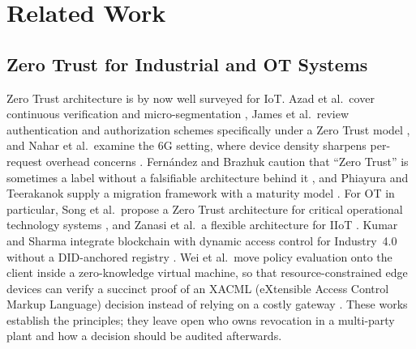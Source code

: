 \section{Related Work}\label{sec:related}

\subsection{Zero Trust for Industrial and OT Systems}
Zero Trust architecture is by now well surveyed for IoT. Azad et al.\ cover continuous verification and micro-segmentation \cite{azad2024verify}, James et al.\ review authentication and authorization schemes specifically under a Zero Trust model \cite{james2024authz}, and Nahar et al.\ examine the 6G setting, where device density sharpens per-request overhead concerns \cite{nahar2024survey}. Fern\'andez and Brazhuk caution that ``Zero Trust'' is sometimes a label without a falsifiable architecture behind it \cite{fernandez2024critical}, and Phiayura and Teerakanok supply a migration framework with a maturity model \cite{phiayura2023comprehensive}. For OT in particular, Song et al.\ propose a Zero Trust architecture for critical operational technology systems \cite{song2025ztot}, and Zanasi et al.\ a flexible architecture for IIoT \cite{zanasi2024flexible}. Kumar and Sharma integrate blockchain with dynamic access control for Industry~4.0 without a DID-anchored registry \cite{kumar2024industry40}. Wei et al.\ move policy evaluation onto the client inside a zero-knowledge virtual machine, so that resource-constrained edge devices can verify a succinct proof of an XACML (eXtensible Access Control Markup Language) decision instead of relying on a costly gateway \cite{prezta2026}. These works establish the principles; they leave open who owns revocation in a multi-party plant and how a decision should be audited afterwards.

